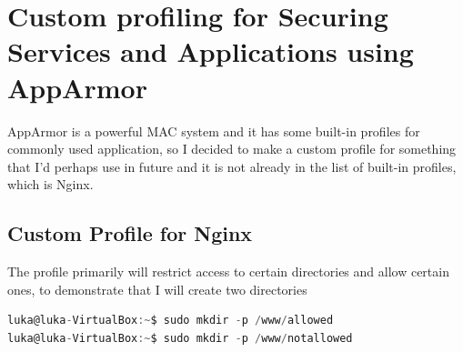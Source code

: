 \documentclass[12pt,a4paper]{article} %
\begin{document}
\section{Custom profiling for Securing Services and Applications using AppArmor }
AppArmor is a powerful MAC system and it has some built-in profiles for commonly used application, so I decided to make a custom profile for something that I'd perhaps use in future and it is not already in the list of built-in profiles, which is Nginx.

\subsection{Custom Profile for Nginx}
The profile primarily will restrict access to certain directories and allow certain ones, to demonstrate that I will create two directories \begin{mdframed}[backgroundcolor=light-gray, roundcorner=10pt,leftmargin=1, rightmargin=1, innerleftmargin=15, innertopmargin=15,innerbottommargin=15, outerlinewidth=1, linecolor=light-gray]
\begin{lstlisting}[language=C]
luka@luka-VirtualBox:~$ sudo mkdir -p /www/allowed
luka@luka-VirtualBox:~$ sudo mkdir -p /www/notallowed
\end{lstlisting} \end{mdframed}
\end{document}
